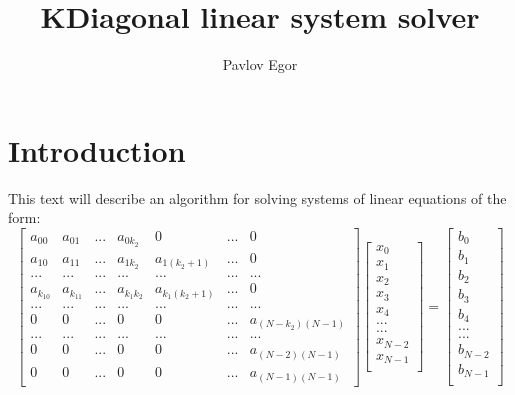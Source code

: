 \documentclass{article}
\title{KDiagonal linear system solver}
\author{Pavlov Egor}
\begin{document}
\maketitle


\section{Introduction}
This text will describe an algorithm for solving systems of linear equations of the form:
\begin{equation}
\begin{bmatrix}
a_{00} & a_{01} & ... & a_{0k_2} & 0 &... & 0 \\
a_{10} & a_{11} & ... & a_{1k_2} & a_{1 (k_2+1)} &... & 0 \\
... & ... & ... & ... & ... &... & ... \\
a_{k_10} & a_{k_11} & ... & a_{k_1k_2} & a_{k_1(k_2+1)} &... & 0 \\
... & ... & ... & ... & ... &... & ... \\
0 & 0 & ... & 0 & 0 &... & a_{(N-k_2)(N-1)} \\
... & ... & ... & ... & ... &... & ... \\
0 & 0 & ... & 0 & 0 &... & a_{(N-2)(N-1)} \\
0 & 0 & ... & 0 & 0 &... & a_{(N-1)(N-1)}
\end{bmatrix} \begin{bmatrix}
x_0 \\
x_1 \\
x_2 \\
x_3 \\
x_4 \\
... \\
... \\
x_{N-2} \\
x_{N-1} \\
\end{bmatrix} = \begin{bmatrix}
b_0 \\
b_1 \\
b_2 \\
b_3 \\
b_4 \\
... \\
... \\
b_{N-2} \\
b_{N-1} \\ 
\end{bmatrix} 
\end{equation}
\end{document}
